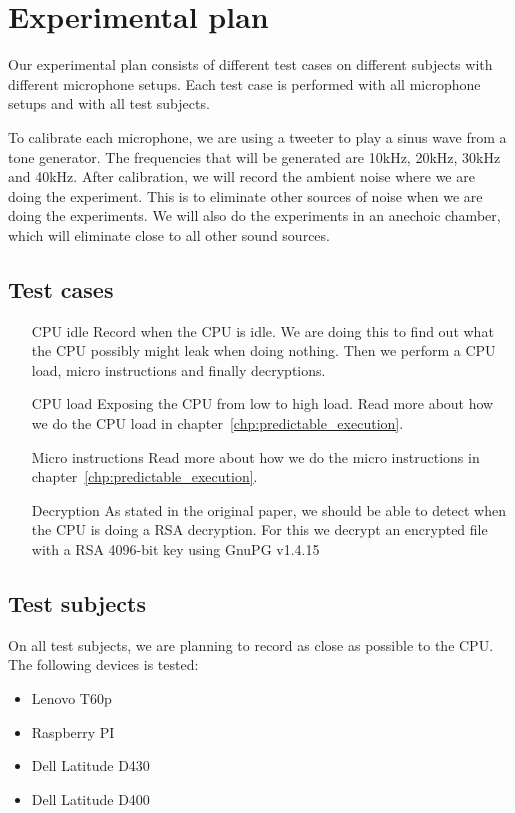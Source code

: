 \section{Experimental plan}\label{sec:ch3_experimental_plan}

Our experimental plan consists of different test cases on different subjects with different microphone setups. 
Each test case is performed with all microphone setups and with all test subjects. 

To calibrate each microphone, we are using a tweeter to play a sinus wave from a tone generator. 
The frequencies that will be generated are 10kHz, 20kHz, 30kHz and 40kHz.
After calibration, we will record the ambient noise where we are doing the experiment.
This is to eliminate other sources of noise when we are doing the experiments.
We will also do the experiments in an anechoic chamber, which will eliminate close to all other sound sources.

\subsection{Test cases}


\begin{enumerate}
  \item[CPU idle] Record when the CPU is idle. 
  We are doing this to find out what the CPU possibly might leak when doing nothing. 
  Then we perform a CPU load, micro instructions and finally decryptions.
  \item[CPU load] Exposing the CPU from low to high load.
  Read more about how we do the CPU load in chapter~\ref{chp:predictable_execution}.
  \item[Micro instructions] Read more about how we do the micro instructions in chapter~\ref{chp:predictable_execution}.
  \item[Decryption] As stated in the original paper, we should be able to detect when the CPU is doing a RSA decryption. 
  For this we decrypt an encrypted file with a RSA 4096-bit key using GnuPG v1.4.15~\cite{GnuPG_1.4.15}
\end{enumerate}

\subsection{Test subjects}
On all test subjects, we are planning to record as close as possible to the CPU. 
The following devices is tested:

\begin{itemize}[topsep=-1em,parsep=0em,itemsep=0em]
 \item Lenovo T60p
 \item Raspberry PI
 \item Dell Latitude D430
 \item Dell Latitude D400
\end{itemize}

